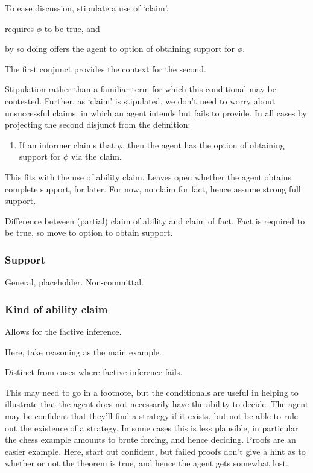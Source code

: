 \documentclass[10pt]{article}
\begin{document}
\begin{note}
  To ease discussion, stipulate a use of `claim'.
\begin{enumerate*}[label=\roman*)]
\item requires \(\phi\) to be true, and \item by so doing offers the agent to option of obtaining support for \(\phi\).
\end{enumerate*}
The first conjunct provides the context for the second.

Stipulation rather than a familiar term for which this conditional may be contested.
Further, as `claim' is stipulated, we don't need to worry about unsuccessful claims, in which an agent intends but fails to provide.
In all cases by projecting the second disjunct from the definition:
\begin{enumerate}
\item\label{cond:claim-to-opt-supp} If an informer claims that \(\phi\), then the agent has the option of obtaining support for \(\phi\) via the claim.
\end{enumerate}

This fits with the use of ability claim.
Leaves open whether the agent obtains complete support, for later.
For now, no claim for fact, hence assume strong full support.

Difference between (partial) claim of ability and claim of fact.
Fact is required to be true, so move to option to obtain support.
\end{note}

\subsubsection{Support}
\label{sec:support}

General, placeholder.
Non-committal.


\subsubsection{Kind of ability claim}
\label{sec:kind-ability-claim}

Allows for the factive inference.

Here, take reasoning as the main example.

Distinct from cases where factive inference fails.

\begin{note}
  This may need to go in a footnote, but the conditionals are useful in helping to illustrate that the agent does not necessarily have the ability to decide.
  The agent may be confident that they'll find a strategy if it exists, but not be able to rule out the existence of a strategy.
  In some cases this is less plausible, in particular the chess example amounts to brute forcing, and hence deciding.
  Proofs are an easier example.
  Here, start out confident, but failed proofs don't give a hint as to whether or not the theorem is true, and hence the agent gets somewhat lost.
\end{note}
\end{document}
